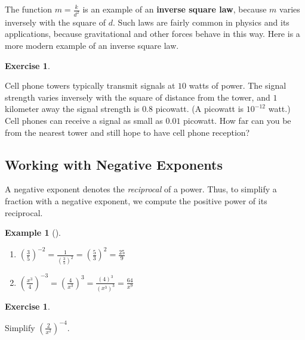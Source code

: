\documentclass[10pt,]{book}
\newcommand{\terminology}[1]{\textbf{#1}}
\theoremstyle{plain}
\theoremstyle{definition}
\theoremstyle{definition}
\theoremstyle{definition}
\newtheorem{example}[theorem]{Example}
\theoremstyle{definition}
\theoremstyle{definition}
\newtheorem{exercise}[theorem]{Exercise}
\numberwithin{equation}{section}
\begin{document}
    The function \(m = \frac{k}{d^2}\) is an example of an \terminology{inverse square law}, because \(m\) varies inversely with the square of \(d\). Such laws are fairly common in physics and its applications, because gravitational and other forces behave in this way. Here is a more modern example of an inverse square law.
%
\begin{exercise}\label{exercise-cellphone-coverage}

    Cell phone towers typically transmit signals at \(10\) watts of power. The signal strength varies inversely with the square of distance from the tower, and \(1\) kilometer away the signal strength is \(0.8\) picowatt. (A picowatt is \(10^{−12}\) watt.) Cell phones can receive a signal as small as \(0.01\) picowatt. How far can you be from the nearest tower and still hope to have cell phone reception?
\end{exercise}
\typeout{************************************************}
\typeout{************************************************}
\subsection[Working with Negative Exponents]{Working with Negative Exponents}\label{subsection-65}

    A negative exponent denotes the \emph{reciprocal} of a power. Thus, to simplify a fraction with a  negative exponent, we compute the positive power of its reciprocal.
%
\begin{example}[]\label{example-negative-exponents-on-fractions}
\leavevmode%
\begin{enumerate}[label=*\alph**]
\item\hypertarget{li-447}{}\(\left(\frac{3}{5}\right)^{−2}= \frac{1}{\left(\frac{3}{5}\right)^2}
        = \left(\frac{5}{3}\right)^2 =\frac{25}{9}\)\item\hypertarget{li-448}{}\(\left(\frac{x^3}{4}\right)^{−3}=\left(\frac{4}{x^3}\right)^3
        = \frac{(4)^3}{\left(x^3\right)^3}= \frac{64}{x^9}\)\end{enumerate}
\end{example}
\begin{exercise}\label{exercise-negative-exponent-on-fraction}

    Simplify \(\left(\frac{2}{x^2} \right)^{-4}\).
\end{exercise}
\par
\end{document}
